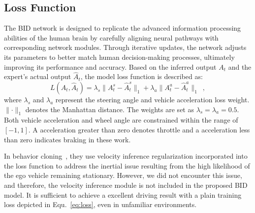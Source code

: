 \subsection{Loss Function}

\hspace{1pc}The BID network is designed to replicate the advanced information processing abilities of the human brain by carefully aligning neural pathways with corresponding network modules. 
Through iterative updates, the network adjusts its parameters to better match human decision-making processes, ultimately improving its performance and accuracy.
%
Based on the inferred output $A_t$ and the expert's actual output $\hat{A}_t$, the model loss function is described as:
\begin{equation}\label{eq:loss}
	L(A_t, \hat{A}_t) 
	= \lambda_{s} \lVert A_{t}^s-\hat{A}_t^s \rVert_{1}
	+ \lambda_{a}\lVert A_{t}^a-\hat{A}_{t}^a\rVert_{1} \enspace ,
\end{equation}
where $\lambda_{s}$ and $\lambda_a$ represent the steering angle and vehicle acceleration loss weight.
$\lVert\cdot\rVert_{1}$ denotes the Manhattan distance.
The weights are set as $\lambda_{s} = \lambda_{a} = 0.5$. 
Both vehicle acceleration and wheel angle are constrained within the range of $[-1, 1]$.
A acceleration greater than zero denotes throttle and a acceleration less than zero indicates braking in these work.


In behavior cloning~\cite{Codevilla:2019}, they use velocity inference regularization incorporated into the loss function to address the inertial issue resulting from the high likelihood of the ego vehicle remaining stationary.
However, we did not encounter this issue, and therefore, the velocity inference module is not included in the proposed BID model.
It is sufficient to achieve a excellent driving result with a plain training loss depicted in Equ.~\ref{eq:loss}, even in unfamiliar environments.
%


%

